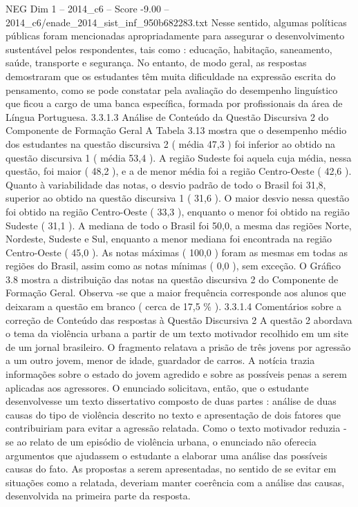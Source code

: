 \begin{textsample}{NEG Dim 1 – 2014\_c6 – Score -9.00 – 2014\_c6/enade\_2014\_sist\_inf\_950b682283.txt}
Nesse sentido, algumas políticas públicas foram mencionadas apropriadamente para assegurar o desenvolvimento sustentável pelos respondentes, tais como : educação, habitação, saneamento, saúde, transporte e segurança.
No entanto, de modo geral, as respostas demostraram que os estudantes têm muita dificuldade na expressão escrita do pensamento, como se pode constatar pela avaliação do desempenho linguístico que ficou a cargo de uma banca específica, formada por profissionais da área de Língua Portuguesa. 3.3.1.3 Análise de Conteúdo da Questão Discursiva 2 do Componente de Formação Geral A Tabela 3.13 mostra que o desempenho médio dos estudantes na questão discursiva 2 ( média 47,3 ) foi inferior ao obtido na questão discursiva 1 ( média 53,4 ).
A região Sudeste foi aquela cuja média, nessa questão, foi maior ( 48,2 ), e a de menor média foi a região Centro-Oeste ( 42,6 ).
Quanto à variabilidade das notas, o desvio padrão de todo o Brasil foi 31,8, superior ao obtido na questão discursiva 1 ( 31,6 ).
O maior desvio nessa questão foi obtido na região Centro-Oeste ( 33,3 ), enquanto o menor foi obtido na região Sudeste ( 31,1 ).
A mediana de todo o Brasil foi 50,0, a mesma das regiões Norte, Nordeste, Sudeste e Sul, enquanto a menor mediana foi encontrada na região Centro-Oeste ( 45,0 ).
As notas máximas ( 100,0 ) foram as mesmas em todas as regiões do Brasil, assim como as notas mínimas ( 0,0 ), sem exceção.
O Gráfico 3.8 mostra a distribuição das notas na questão discursiva 2 do Componente de Formação Geral.
Observa -se que a maior frequência corresponde aos alunos que deixaram a questão em branco ( cerca de 17,5 \% ). 3.3.1.4 Comentários sobre a correção de Conteúdo das respostas à Questão Discursiva 2 A questão 2 abordava o tema da violência urbana a partir de um texto motivador recolhido em um site de um jornal brasileiro.
O fragmento relatava a prisão de três jovens por agressão a um outro jovem, menor de idade, guardador de carros.
A notícia trazia informações sobre o estado do jovem agredido e sobre as possíveis penas a serem aplicadas aos agressores.
O enunciado solicitava, então, que o estudante desenvolvesse um texto dissertativo composto de duas partes : análise de duas causas do tipo de violência descrito no texto e apresentação de dois fatores que contribuiriam para evitar a agressão relatada.
Como o texto motivador reduzia -se ao relato de um episódio de violência urbana, o enunciado não oferecia argumentos que ajudassem o estudante a elaborar uma análise das possíveis causas do fato.
As propostas a serem apresentadas, no sentido de se evitar em situações como a relatada, deveriam manter coerência com a análise das causas, desenvolvida na primeira parte da resposta.

\end{textsample}

